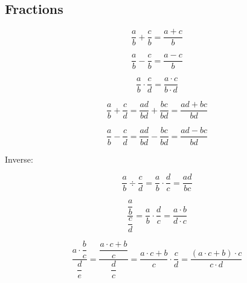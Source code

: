 
\vspace{0.5cm}\subsection{Fractions}

\vspace{0.5cm}\begin{definition}\label{def-fractions}

    \begin{equation}
        \frac{a}{b} + \frac{c}{b} = \frac{a + c}{b} \label{eq-9}
    \end{equation}

    \begin{equation}
        \frac{a}{b} - \frac{c}{b} = \frac{a - c}{b} \label{eq-10}
    \end{equation}

    \begin{equation}
        \frac{a}{b} \cdot  \frac{c}{d} = \frac{a \cdot c}{b \cdot d} \label{eq-11}
    \end{equation}

    \begin{equation}
        \frac{a}{b} + \frac{c}{d} = \frac{ad}{bd} + \frac{bc}{bd} = \frac{ad + bc}{bd} \label{eq-12}
    \end{equation}

    \begin{equation}
        \frac{a}{b} - \frac{c}{d} = \frac{ad}{bd} - \frac{bc}{bd} = \frac{ad - bc}{bd} \label{eq-13}
    \end{equation}

    \flushleft \normalfont Inverse: 

    \begin{equation}
        \frac{a}{b} \div \frac{c}{d} = \frac{a}{b} \cdot \frac{d}{c} = \frac{ad}{bc} \label{eq-14}
    \end{equation}

    \begin{equation}
        \dfrac{\dfrac{a}{b}}{\dfrac{c}{d}} = \frac{a}{b} \cdot \frac{d}{c} = \frac{a \cdot b}{d \cdot c} \label{eq-15}
    \end{equation}

    \begin{equation}
        \dfrac{a \cdot \dfrac{b}{c}}{\dfrac{d}{e}} = \dfrac{\dfrac{a \cdot c + b}{c}}{\dfrac{d}{c}} = \dfrac{a \cdot c + b}{c} \cdot \dfrac{c}{d} = \dfrac{(a \cdot c + b) \cdot c}{c \cdot d} \label{eq-16}
    \end{equation}


\end{definition}
